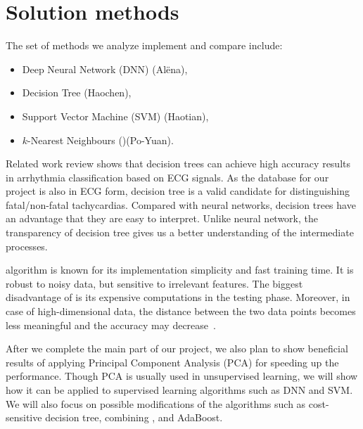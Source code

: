 \section{Solution methods}
\label{sec:methods}

The set of methods we analyze implement and compare include: 
\begin{itemize}
	\item Deep Neural Network (DNN) (Al\"ena),
	\item Decision Tree (Haochen),
	\item Support Vector Machine (SVM) (Haotian),
	\item $k$-Nearest Neighbours (\knn)(Po-Yuan).	
\end{itemize}

Related work review shows that decision trees can achieve high 
accuracy results in arrhythmia classification based on ECG signals. 
As the database for our project is also in ECG form, decision tree is 
a valid candidate for distinguishing fatal/non-fatal tachycardias. 
Compared with neural networks, decision trees have an advantage that 
they are easy to interpret. 
Unlike neural network, the transparency of decision tree gives us a 
better understanding of the intermediate processes.
 
\knn algorithm is known for its implementation simplicity and fast 
training time. 
It is robust to noisy data, but sensitive to 
irrelevant features. 
The biggest disadvantage of \knn is its expensive computations in 
the testing phase. 
Moreover, in case of high-dimensional data, the distance between the 
two data points becomes less meaningful and the accuracy may 
decrease~\cite{beyer1999nearest}. 


After we complete the main part of our project,
we also plan to show  beneficial results of applying Principal 
Component 
Analysis (PCA) for speeding up the performance. Though PCA is 
usually used in unsupervised learning, we will show how it can be 
applied to supervised learning algorithms such as DNN and SVM.  
We will also focus on possible modifications of the algorithms such 
as cost-sensitive decision tree, combining \knn, and
AdaBoost. 
